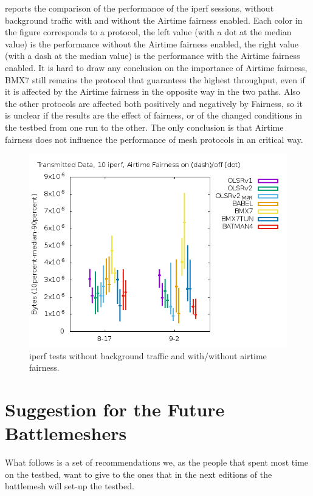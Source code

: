 \documentclass[10pt,onecolumn]{paper}
\begin{document}
 reports the comparison of the performance of the iperf
sessions, without background traffic with and without the Airtime fairness
enabled. Each color in the figure corresponds to a protocol, the left value
(with a dot at the median value) is the performance without the Airtime fairness
enabled, the right value (with a dash at the median value) is the performance
with the Airtime fairness enabled. It is hard to draw any conclusion on the
importance of Airtime fairness, BMX7 still remains the protocol that guarantees
the highest throughput, even if it is affected by the Airtime fairness in the
opposite way in the two paths. Also the other protocols are affected both positively
and negatively by Fairness, so it is unclear if the results are the effect of
fairness, or of the changed conditions in the testbed from one run to the other.
The only conclusion is that Airtime fairness does not influence the performance
of mesh protocols in an critical way. 


\begin{figure}[!htb]
  \centering
    \includegraphics[width=.9\linewidth]{images/failure_test_iperf_10runs-IPv6_noairfair.png}
    \caption{iperf tests without background traffic and with/without airtime fairness.}
  \label{fig:iperfnofair}
\end{figure}

\FloatBarrier
\section{Suggestion for the Future Battlemeshers}

What follows is a set of recommendations we, as the people that spent most time
on the testbed, want to give to the ones that in the next editions of the
battlemesh will set-up the testbed. 
\end{document}
